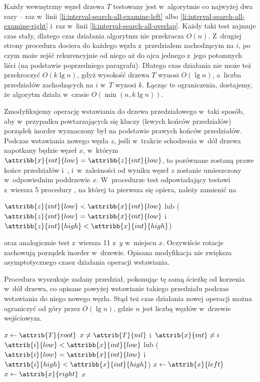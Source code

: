 Każdy wewnętrzny węzeł drzewa $T$ testowany jest w~algorytmie co najwyżej dwa razy -- raz w~linii \ref{li:interval-search-all-examine-left} albo \ref{li:interval-search-all-examine-right} i~raz w~linii \ref{li:interval-search-all-overlap}.
Każdy taki test zajmuje czas stały, dlatego czas działania algorytmu nie przekracza $O(n)$.
Z~drugiej strony procedura dociera do każdego węzła z~przedziałem zachodzącym na $i$, po czym może zejść rekurencyjnie od niego aż do ojca jednego z~jego potomnych liści (na podstawie poprzedniego paragrafu).
Dlatego czas działania nie może też przekroczyć $O(k\lg n)$, gdyż wysokość drzewa $T$ wynosi $O(\lg n)$, a~liczba przedziałów zachodzących na $i$ w~$T$ wynosi $k$.
Łącząc te ograniczenia, dostajemy, że algorytm działa w~czasie $O(\min(n,k\lg n))$.

\exercise %
Zmodyfikujemy operację wstawiania do drzewa przedziałowego w~taki sposób, aby w~przypadku powtarzających się kluczy (lewych końców przedziałów) porządek inorder wyznaczony był na podstawie prawych końców przedziałów.
Podczas wstawiania nowego węzła $z$, jeśli w~trakcie schodzenia w~dół drzewa napotkany będzie węzeł $x$, w~którym $\attribb{x}{int}{low}=\attribb{z}{int}{low}$, to porównane zostaną prawe końce przedziałów  i~, i~w~zależności od wyniku węzeł $z$ zostanie umieszczony w~odpowiednim poddrzewie $x$.
W~procedurze  test odpowiadający testowi z~wiersza 5 procedury , na której ta pierwsza się opiera, należy zamienić na
\begin{codebox}
\zi \If $\attribb{z}{int}{low}<\attribb{x}{int}{low}$ lub ($\attribb{z}{int}{low}=\attribb{x}{int}{low}$ i~$\attribb{z}{int}{high}<\attribb{x}{int}{high}$)
\end{codebox}
oraz analogicznie test z~wiersza 11 z~$y$ w~miejscu $x$.
Oczywiście rotacje zachowują porządek inorder w~drzewie.
Opisana modyfikacja nie zwiększa asymptotycznego czasu działania operacji wstawiania.

Procedura  wyszukuje zadany przedział, pokonując tę samą ścieżkę od korzenia w~dół drzewa, co opisane powyżej wstawianie takiego przedziału podczas wstawiania do niego nowego węzła.
Stąd też czas działania nowej operacji można ograniczyć od góry przez $O(\lg n)$, gdzie $n$ jest liczbą węzłów w~drzewie wejściowym.
\begin{codebox}
\li	$x\gets\attrib{T}{root}$
\li	\While $x\ne\attrib{T}{nil}$ i~$\attrib{x}{int}\ne i$
\li		\Do \If $\attrib{i}{low}<\attribb{x}{int}{low}$ lub ($\attrib{i}{low}=\attribb{x}{int}{low}$ i~$\attrib{i}{high}<\attribb{x}{int}{high}$)
\li				\Then $x\gets\attrib{x}{left}$
\li				\Else $x\gets\attrib{x}{right}$
				\End
		\End
\li	\Return $x$
\end{codebox}

